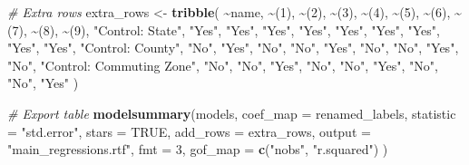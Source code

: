\documentclass[
]{article}
\newenvironment{Shaded}{\begin{snugshade}}{\end{snugshade}}
\newcommand{\AttributeTok}[1]{\textcolor[rgb]{0.13,0.29,0.53}{#1}}
\newcommand{\CommentTok}[1]{\textcolor[rgb]{0.56,0.35,0.01}{\textit{#1}}}
\newcommand{\ConstantTok}[1]{\textcolor[rgb]{0.56,0.35,0.01}{#1}}
\newcommand{\DecValTok}[1]{\textcolor[rgb]{0.00,0.00,0.81}{#1}}
\newcommand{\FunctionTok}[1]{\textcolor[rgb]{0.13,0.29,0.53}{\textbf{#1}}}
\newcommand{\NormalTok}[1]{#1}
\newcommand{\OtherTok}[1]{\textcolor[rgb]{0.56,0.35,0.01}{#1}}
\newcommand{\SpecialCharTok}[1]{\textcolor[rgb]{0.81,0.36,0.00}{\textbf{#1}}}
\newcommand{\StringTok}[1]{\textcolor[rgb]{0.31,0.60,0.02}{#1}}
\begin{document}
\begin{Shaded}
\begin{Highlighting}[]
\CommentTok{\# Extra rows}
\NormalTok{extra\_rows }\OtherTok{\textless{}{-}} \FunctionTok{tribble}\NormalTok{(}
  \SpecialCharTok{\textasciitilde{}}\NormalTok{name, }\SpecialCharTok{\textasciitilde{}}\StringTok{\textasciigrave{}}\AttributeTok{(1)}\StringTok{\textasciigrave{}}\NormalTok{, }\SpecialCharTok{\textasciitilde{}}\StringTok{\textasciigrave{}}\AttributeTok{(2)}\StringTok{\textasciigrave{}}\NormalTok{, }\SpecialCharTok{\textasciitilde{}}\StringTok{\textasciigrave{}}\AttributeTok{(3)}\StringTok{\textasciigrave{}}\NormalTok{, }\SpecialCharTok{\textasciitilde{}}\StringTok{\textasciigrave{}}\AttributeTok{(4)}\StringTok{\textasciigrave{}}\NormalTok{, }\SpecialCharTok{\textasciitilde{}}\StringTok{\textasciigrave{}}\AttributeTok{(5)}\StringTok{\textasciigrave{}}\NormalTok{, }\SpecialCharTok{\textasciitilde{}}\StringTok{\textasciigrave{}}\AttributeTok{(6)}\StringTok{\textasciigrave{}}\NormalTok{, }\SpecialCharTok{\textasciitilde{}}\StringTok{\textasciigrave{}}\AttributeTok{(7)}\StringTok{\textasciigrave{}}\NormalTok{, }\SpecialCharTok{\textasciitilde{}}\StringTok{\textasciigrave{}}\AttributeTok{(8)}\StringTok{\textasciigrave{}}\NormalTok{, }\SpecialCharTok{\textasciitilde{}}\StringTok{\textasciigrave{}}\AttributeTok{(9)}\StringTok{\textasciigrave{}}\NormalTok{,}
  \StringTok{"Control: State"}\NormalTok{, }\StringTok{"Yes"}\NormalTok{, }\StringTok{"Yes"}\NormalTok{, }\StringTok{"Yes"}\NormalTok{, }\StringTok{"Yes"}\NormalTok{, }\StringTok{"Yes"}\NormalTok{, }\StringTok{"Yes"}\NormalTok{, }\StringTok{"Yes"}\NormalTok{, }\StringTok{"Yes"}\NormalTok{, }\StringTok{"Yes"}\NormalTok{,}
  \StringTok{"Control: County"}\NormalTok{, }\StringTok{"No"}\NormalTok{, }\StringTok{"Yes"}\NormalTok{, }\StringTok{"No"}\NormalTok{, }\StringTok{"No"}\NormalTok{, }\StringTok{"Yes"}\NormalTok{, }\StringTok{"No"}\NormalTok{, }\StringTok{"No"}\NormalTok{, }\StringTok{"Yes"}\NormalTok{, }\StringTok{"No"}\NormalTok{,}
  \StringTok{"Control: Commuting Zone"}\NormalTok{, }\StringTok{"No"}\NormalTok{, }\StringTok{"No"}\NormalTok{, }\StringTok{"Yes"}\NormalTok{, }\StringTok{"No"}\NormalTok{, }\StringTok{"No"}\NormalTok{, }\StringTok{"Yes"}\NormalTok{, }\StringTok{"No"}\NormalTok{, }\StringTok{"No"}\NormalTok{, }\StringTok{"Yes"}
\NormalTok{)}

\CommentTok{\# Export table}
\FunctionTok{modelsummary}\NormalTok{(models,}
             \AttributeTok{coef\_map =}\NormalTok{ renamed\_labels,}
             \AttributeTok{statistic =} \StringTok{"std.error"}\NormalTok{,}
             \AttributeTok{stars =} \ConstantTok{TRUE}\NormalTok{,}
             \AttributeTok{add\_rows =}\NormalTok{ extra\_rows,}
             \AttributeTok{output =} \StringTok{"main\_regressions.rtf"}\NormalTok{,}
             \AttributeTok{fmt =} \DecValTok{3}\NormalTok{,}
             \AttributeTok{gof\_map =} \FunctionTok{c}\NormalTok{(}\StringTok{"nobs"}\NormalTok{, }\StringTok{"r.squared"}\NormalTok{)}
\NormalTok{)}
\end{Highlighting}
\end{Shaded}
\end{document}
